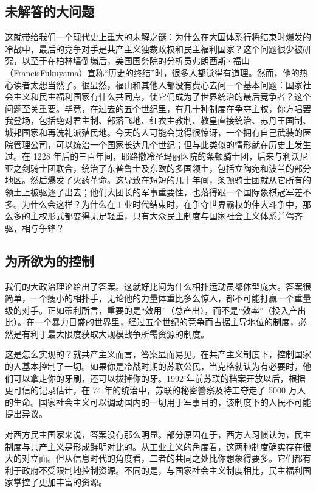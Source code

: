 \subsection{未解答的大问题}
这就带给我们一个现代史上重大的未解之谜：为什么在大国体系行将结束时爆发的冷战中，最后的竞争对手是共产主义独裁政权和民主福利国家？这个问题很少被研究，以至于在柏林墙倒塌后，美国国务院的分析员弗朗西斯·福山（FrancisFukuyama）宣称“历史的终结”时，很多人都觉得有道理。然而，他的热心读者太想当然了。很显然，福山和其他人都没有费心去问一个基本问题：国家社会主义和民主福利国家有什么共同点，使它们成为了世界统治的最后竞争者？这个问题至关重要。毕竟，在过去的五个世纪里，有几十种制度在争夺主权，你方唱罢我登场，包括绝对君主制、部落飞地、红衣主教制、教皇直接统治、苏丹王国制、城邦国家和再洗礼派殖民地。今天的人可能会觉得很惊讶，一个拥有自己武装的医院管理公司，可以统治一个国家长达几个世纪；但与此类似的情形就在历史上发生过。在 1228 年后的三百年间，耶路撒冷圣玛丽医院的条顿骑士团，后来与利沃尼亚之剑骑士团联合，统治了东普鲁士及东欧的多国领土，包括立陶宛和波兰的部分地区。然后爆发了火药革命。这导致在短短的几十年间，条顿骑士团就从它所有的领土上被驱逐了出去；他们大团长的军事重要性，也落得跟一个国际象棋冠军差不多。为什么会这样？为什么在工业时代结束时，在争夺世界霸权的伟大斗争中，那么多的主权形式都变得无足轻重，只有大众民主制度与国家社会主义体系并驾齐驱，相与争锋？

\subsection{为所欲为的控制}
我们的大政治理论给出了答案。这就好比问为什么相扑运动员都体型庞大。答案很简单，一个瘦小的相扑手，无论他的力量体重比多么惊人，都不可能打赢一个重量级的对手。正如蒂利所言，重要的是“效用”（总产出），而不是“效率”（投入产出比）。在一个暴力日盛的世界里，经过五个世纪的竞争而占据主导地位的制度，必然是有利于最大限度获取大规模战争所需资源的制度。

这是怎么实现的？就共产主义而言，答案显而易见。在共产主义制度下，控制国家的人基本控制了一切。如果你是冷战时期的苏联公民，当克格勃认为有必要时，他们可以拿走你的牙刷，还可以拔掉你的牙。1992 年前苏联的档案开放以后，根据更可信的记录估计，在 74 年的统治中，苏联的秘密警察及特工夺走了 5000 万人的生命。国家社会主义可以调动国内的一切用于军事目的，该制度下的人民不可能提出异议。

对西方民主国家来说，答案没有那么明显。部分原因在于，西方人习惯认为，民主制度与共产主义是形成鲜明对比的。从工业主义的角度看，这两种制度确实存在很大的对立面。但从信息时代的角度看，二者的共同之处比你想象得要多。它们都有利于政府不受限制地控制资源。不同的是，与国家社会主义制度相比，民主福利国家掌控了更加丰富的资源。


